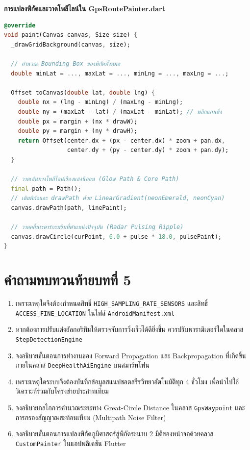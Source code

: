 \begin{codebox}
\textbf{การแปลงพิกัดและวาดโพลีไลน์ใน GpsRoutePainter.dart}
\begin{lstlisting}[language=Dart]
@override
void paint(Canvas canvas, Size size) {
  _drawGridBackground(canvas, size);

  // คำนวณ Bounding Box ของพิกัดทั้งหมด
  double minLat = ..., maxLat = ..., minLng = ..., maxLng = ...;

  Offset toCanvas(double lat, double lng) {
    double nx = (lng - minLng) / (maxLng - minLng);
    double ny = (maxLat - lat) / (maxLat - minLat); // พลิกแกนดิ่ง
    double px = margin + (nx * drawW);
    double py = margin + (ny * drawH);
    return Offset(center.dx + (px - center.dx) * zoom + pan.dx,
                  center.dy + (py - center.dy) * zoom + pan.dy);
  }

  // วาดเส้นทางโพลีไลน์เรืองแสงนีออน (Glow Path & Core Path)
  final path = Path();
  // เติมพิกัดและ drawPath ด้วย LinearGradient(neonEmerald, neonCyan)
  canvas.drawPath(path, linePaint);

  // วาดคลื่นเรดาร์กะพริบที่ตำแหน่งปัจจุบัน (Radar Pulsing Ripple)
  canvas.drawCircle(curPoint, 6.0 + pulse * 18.0, pulsePaint);
}
\end{lstlisting}
\end{codebox}

\section*{คำถามทบทวนท้ายบทที่ 5}
\begin{enumerate}
    \item เพราะเหตุใดจึงต้องกำหนดสิทธิ์ \texttt{HIGH\_SAMPLING\_RATE\_SENSORS} และสิทธิ์ \texttt{ACCESS\_FINE\_LOCATION} ในไฟล์ \texttt{AndroidManifest.xml}
    \item หากต้องการปรับแต่งอัลกอริทึมให้ตรวจจับการวิ่งเร็วได้ดียิ่งขึ้น ควรปรับพารามิเตอร์ใดในคลาส \texttt{StepDetectionEngine}
    \item จงอธิบายขั้นตอนการทำงานของ Forward Propagation และ Backpropagation ที่เกิดขึ้นภายในคลาส \texttt{DeepHealthAiEngine} บนสมาร์ทโฟน
    \item เพราะเหตุใดระบบจึงต้องบันทึกข้อมูลสแนปชอตสรีรวิทยาอัตโนมัติทุก 4 ชั่วโมง เพื่อนำไปใช้วิเคราะห์ร่วมกับโครงข่ายประสาทเทียม
    \item จงอธิบายกลไกการคำนวณระยะทาง Great-Circle Distance ในคลาส \texttt{GpsWaypoint} และการกรองสัญญาณสะท้อนเทียม (Multipath Noise Filter)
    \item จงอธิบายขั้นตอนการแปลงพิกัดภูมิศาสตร์สู่พิกัดระนาบ 2 มิติของหน้าจอด้วยคลาส \texttt{CustomPainter} ในแอปพลิเคชัน Flutter
\end{enumerate}
\clearpage
